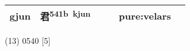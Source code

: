 \documentclass[14pt,a4paper]{scrartcl}
\begin{document}
\begin{longtable}[c]{@{}llllll@{}}
\begin{minipage}[t]{0.14\columnwidth}\raggedright\strut
gjun
\strut\end{minipage} &
\begin{minipage}[t]{0.14\columnwidth}\raggedright\strut
君\textsuperscript{541b~kjun}
\strut\end{minipage} &
\begin{minipage}[t]{0.14\columnwidth}\raggedright\strut
\strut\end{minipage} &
\begin{minipage}[t]{0.14\columnwidth}\raggedright\strut
\strut\end{minipage} &
\begin{minipage}[t]{0.14\columnwidth}\raggedright\strut
pure:velars
\strut\end{minipage}\tabularnewline
\bottomrule
\end{longtable}

(13) 0540 {[}5{]}
\end{document}
